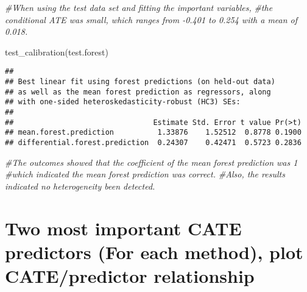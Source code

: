 \documentclass[
]{article}
\newenvironment{Shaded}{\begin{snugshade}}{\end{snugshade}}
\newcommand{\CommentTok}[1]{\textcolor[rgb]{0.56,0.35,0.01}{\textit{#1}}}
\newcommand{\FunctionTok}[1]{\textcolor[rgb]{0.00,0.00,0.00}{#1}}
\newcommand{\NormalTok}[1]{#1}
\begin{document}
\begin{Shaded}
\begin{Highlighting}[]
\CommentTok{\#When using the test data set and fitting the important variables,}
 \CommentTok{\#the conditional ATE was small, which ranges from {-}0.401 to 0.254 with a mean of 0.018.}

\FunctionTok{test\_calibration}\NormalTok{(test.forest)}
\end{Highlighting}
\end{Shaded}

\begin{verbatim}
## 
## Best linear fit using forest predictions (on held-out data)
## as well as the mean forest prediction as regressors, along
## with one-sided heteroskedasticity-robust (HC3) SEs:
## 
##                                Estimate Std. Error t value Pr(>t)
## mean.forest.prediction          1.33876    1.52512  0.8778 0.1900
## differential.forest.prediction  0.24307    0.42471  0.5723 0.2836
\end{verbatim}

\begin{Shaded}
\begin{Highlighting}[]
\CommentTok{\#The outcomes showed that the coefficient of the mean forest prediction was 1 }
 \CommentTok{\#which indicated the mean forest prediction was correct. }
\CommentTok{\#Also, the results indicated no heterogeneity been detected.}
\end{Highlighting}
\end{Shaded}

\hypertarget{two-most-important-cate-predictors-for-each-method-plot-catepredictor-relationship}{%
\section{Two most important CATE predictors (For each method), plot
CATE/predictor
relationship}\label{two-most-important-cate-predictors-for-each-method-plot-catepredictor-relationship}}
\end{document}
